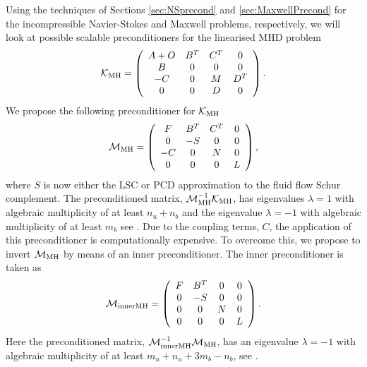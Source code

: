 Using the techniques of Sections \ref{sec:NSprecond} and \ref{sec:MaxwellPrecond} for the incompressible Navier-Stokes and Maxwell problems, respectively, we will look at possible scalable preconditioners for the linearised MHD problem
\begin{equation} \label{eq:K}
    {\mathcal K}_{\rm MH} = \left(
\begin{array}{cccc}
A+O & B^T & C^T & 0\\
B & 0 & 0 & 0\\
-C & 0 & M & D^T \\
0 & 0 & D & 0
\end{array}
\right).
\end{equation}
We propose the following preconditioner for ${\mathcal K}_{\rm MH}$
\begin{equation}
\label{eq:mhd_pc_ls}
\mathcal{M}_{\rm MH} =
\left(
\begin{array}{cccc}
F & B^T & C^T & 0\\
0 & -{S} & 0 & 0 \\
-C & 0 & N & 0\\
0 & 0 & 0 & L
\end{array}
\right),
\end{equation}
where ${S}$ is now either the LSC or PCD approximation to the fluid flow Schur complement. The preconditioned matrix, $\mathcal{M}_{\rm MH}^{-1}{\mathcal K}_{\rm MH}$, has eigenvalues $\lambda = 1$ with algebraic multiplicity of at least $n_u + n_b$ and the eigenvalue $\lambda = -1$ with algebraic multiplicity of at least $m_b$ see \cite[Theorem~8]{li2010numerical}. Due to the coupling terms, $C$, the application of this preconditioner is computationally expensive. To overcome this, we propose to invert  $\mathcal{M}_{\rm MH}$ by means of an inner preconditioner. The inner preconditioner is taken as
\begin{equation}
\label{eq:mhd_pc_inner}
\mathcal{M}_{\rm innerMH} =
\left(
\begin{array}{cccc}
F & B^T & 0 & 0\\
0 & -{S} & 0 & 0 \\
0 & 0 & N & 0\\
0 & 0 & 0 & L
\end{array}
\right).
\end{equation}
Here the preconditioned matrix, $\mathcal{M}_{\rm innerMH}^{-1}{\mathcal M}_{\rm MH}$,  has an eigenvalue $\lambda = −1$ with algebraic multiplicity of at least $m_u +n_u+3m_b -n_b$, see \cite[Theorem~10]{li2010numerical}.




